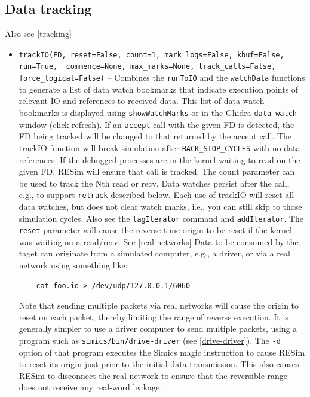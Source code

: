 \documentclass[titlepage]{article}
\begin{document}
\subsection{Data tracking}
Also see \ref{tracking}
\begin{itemize}

\item {\tt trackIO(FD, reset=False, count=1, mark\_logs=False, kbuf=False, run=True, \
             commence=None, max\_marks=None, track\_calls=False, force\_logical=False)} -- Combines the {\tt runToIO} and the {\tt watchData} functions to generate a list of data watch bookmarks that indicate execution
points of relevant IO and references to received data.  This list of data watch bookmarks is displayed using {\tt showWatchMarks} or in the Ghidra {\tt data watch} window (click refresh).
If an {\tt accept} call with the given FD is detected, the FD being tracked will be changed to that returned by the accept call.
The trackIO function will break simulation after {\tt BACK\_STOP\_CYCLES} with no data references. If the debugged processes are in the kernel waiting to read on the given
FD, RESim will ensure that call is tracked.  The count parameter can be used to track the Nth read or recv.   Data watches persist after the
call, e.g., to support {\tt retrack} described below.  Each use of trackIO will reset all data watches, but does not clear watch marks, i.e., you can still skip to those simulation cycles.  Also see 
the {\tt tagIterator} command and {\tt addIterator}.  The {\tt reset} parameter will cause the reverse time origin to be reset if the kernel was waiting on a read/recv. See \ref{real-networks}  Data to be consumed by the taget can originate from a simulated computer, e.g., a driver, or via a real network using something like:
\begin{verbatim}
    cat foo.io > /dev/udp/127.0.0.1/6060 
\end{verbatim}
\noindent Note that sending multiple packets via real networks will cause the origin to reset on each packet, thereby limiting the range of reverse execution.  It is generally simpler
to use a driver computer to send multiple packets, using a program such as {\tt simics/bin/drive-driver} (see \ref{drive-driver}).  The {\tt -d} option of that program executes the Simics magic instruction to cause RESim to reset
its origin just prior to the initial data transmission.  This also causes RESim to disconnect the real network to ensure that the reversible range does not receive any real-word leakage.


\end{itemize}
\end{document}
